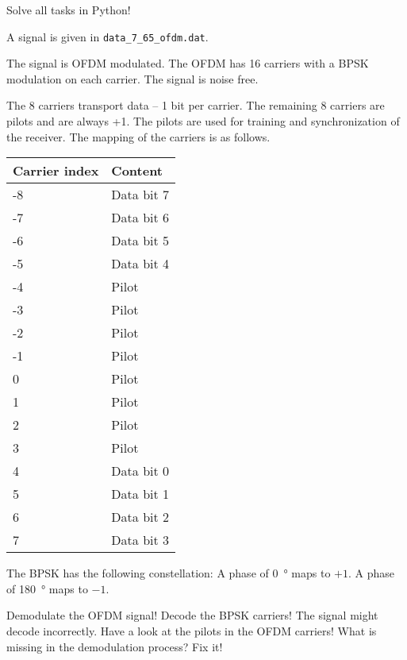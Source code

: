 \begin{question}[subtitle={Python Programming: OFDM}]
	Solve all tasks in Python!
	
	A signal is given in \texttt{data\_7\_65\_ofdm.dat}.
	
	The signal is OFDM modulated. The OFDM has 16 carriers with a BPSK modulation on each carrier. The signal is noise free.
	
	The 8 carriers transport data -- 1 bit per carrier. The remaining 8 carriers are pilots and are always +1. The pilots are used for training and synchronization of the receiver. The mapping of the carriers is as follows.
	\begin{tabular}{|l|l|}
		\hline
		Carrier index & Content \\
		\hline
		\hline
		-8 & Data bit 7 \\
		\hline
		-7 & Data bit 6 \\
		\hline
		-6 & Data bit 5 \\
		\hline
		-5 & Data bit 4 \\
		\hline
		-4 & Pilot \\
		\hline
		-3 & Pilot \\
		\hline
		-2 & Pilot \\
		\hline
		-1 & Pilot \\
		\hline
		0 & Pilot \\
		\hline
		1 & Pilot \\
		\hline
		2 & Pilot \\
		\hline
		3 & Pilot \\
		\hline
		4 & Data bit 0 \\
		\hline
		5 & Data bit 1 \\
		\hline
		6 & Data bit 2 \\
		\hline
		7 & Data bit 3 \\
		\hline
	\end{tabular}

	The BPSK has the following constellation: A phase of \SI{0}{\degree} maps to $+1$. A phase of \SI{180}{\degree} maps to $-1$.

	\begin{tasks}
		\task
		Demodulate the OFDM signal! Decode the BPSK carriers!
		\task
		The signal might decode incorrectly. Have a look at the pilots in the OFDM carriers! What is missing in the demodulation process? Fix it!
	\end{tasks}
\end{question}

